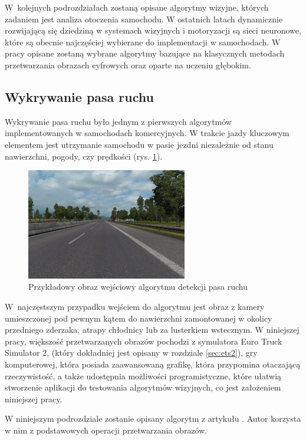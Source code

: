 W~kolejnych podrozdziałach zostaną opisane algorytmy wizyjne, których zadaniem jest analiza otoczenia samochodu. 
W ostatnich latach dynamicznie rozwijającą się dziedziną w systemach wizyjnych i motoryzacji są sieci neuronowe, które są obecnie najczęściej wybierane do implementacji w samochodach. 
W pracy opisane zostaną wybrane algorytmy bazujące na klasycznych metodach przetwarzania obrazach cyfrowych oraz oparte na uczeniu głębokim. 

\subsection{Wykrywanie pasa ruchu}

\label{sec:lane_detection}

Wykrywanie pasa ruchu było jednym z pierwszych algorytmów implementowanych w samochodach komercyjnych. 
W trakcie jazdy kluczowym elementem jest utrzymanie samochodu w pasie jezdni niezależnie od stanu nawierzchni, pogody, czy prędkości (rys. \ref{fig:inputimg1}).

\begin{figure}
  \centering
  \includegraphics[width=7cm]{img/input.png}
  \caption{Przykładowy obraz wejściowy algorytmu detekcji pasa ruchu}
  \label{fig:inputimg1}
  \end{figure}

W~najczęstszym przypadku wejściem do algorytmu jest obraz z kamery umieszczonej pod pewnym kątem do nawierzchni zamontowanej w okolicy przedniego zderzaka, atrapy chłodnicy lub za lusterkiem wstecznym.
W niniejszej pracy, większość przetwarzanych obrazów pochodzi z symulatora Euro Truck Simulator 2, (który dokładniej jest opisany w rozdziale \ref{sec:ets2}), gry komputerowej, która posiada zaawansowaną grafikę, która przypomina otaczającą rzeczywistość, a także udostępnia możliwości programistyczne, które ułatwią stworzenie aplikacji do testowania algorytmów wizyjnych, co jest założeniem niniejszej pracy.

W niniejszym podrozdziale zostanie opisany algorytm z artykułu \cite{T3}. 
Autor korzysta w nim z podstawowych operacji przetwarzania obrazów. 

